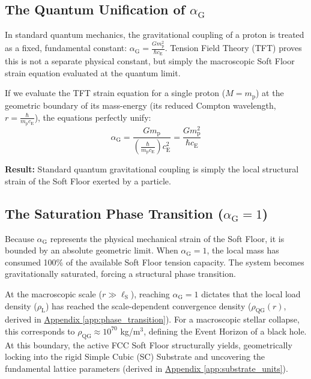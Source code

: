 \subsection*{The Quantum Unification of $\alpha_{\mathrm{G}}$}
In standard quantum mechanics, the gravitational coupling of a proton is treated as a fixed, fundamental constant: $\alpha_{\mathrm{G}} = \frac{G m_{\mathrm{p}}^2}{\hbar c_{\mathrm{E}}}$. Tension Field Theory (TFT) proves this is not a separate physical constant, but simply the macroscopic Soft Floor strain equation evaluated at the quantum limit.

If we evaluate the TFT strain equation for a single proton ($M = m_{\mathrm{p}}$) at the geometric boundary of its mass-energy (its reduced Compton wavelength, $r = \frac{\hbar}{m_{\mathrm{p}} c_{\mathrm{E}}}$), the equations perfectly unify:
\begin{equation}
    \alpha_{\mathrm{G}} = \frac{G m_{\mathrm{p}}}{\left(\frac{\hbar}{m_{\mathrm{p}} c_{\mathrm{E}}}\right) c_{\mathrm{E}}^2} = \frac{G m_{\mathrm{p}}^2}{\hbar c_{\mathrm{E}}}
\end{equation}

\vspace{0.5em}
\noindent\textbf{Result:} Standard quantum gravitational coupling is simply the local structural strain of the Soft Floor exerted by a particle.

\subsection*{The Saturation Phase Transition ($\alpha_{\mathrm{G}} = 1$)}
Because $\alpha_{\mathrm{G}}$ represents the physical mechanical strain of the Soft Floor, it is bounded by an absolute geometric limit. When $\alpha_{\mathrm{G}} = 1$, the local mass has consumed 100\% of the available Soft Floor tension capacity. The system becomes gravitationally saturated, forcing a structural phase transition.

At the macroscopic scale ($r \gg \ell_{\mathrm{S}}$), reaching $\alpha_{\mathrm{G}} = 1$ dictates that the local load density ($\rho_{\mathrm{L}}$) has reached the scale-dependent convergence density ($\rho_{\mathrm{QG}}(r)$, derived in \hyperref[app:phase_transition]{Appendix \ref*{app:phase_transition}}). For a macroscopic stellar collapse, this corresponds to $\rho_{\mathrm{QG}} \approx 10^{70}$ kg/m$^3$, defining the Event Horizon of a black hole. At this boundary, the active FCC Soft Floor structurally yields, geometrically locking into the rigid Simple Cubic (SC) Substrate and uncovering the fundamental lattice parameters (derived in \hyperref[app:substrate_units]{Appendix \ref*{app:substrate_units}}).

